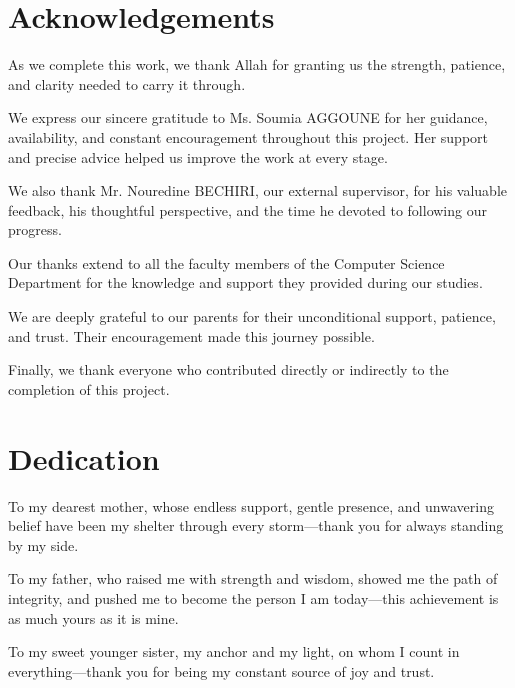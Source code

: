 \documentclass[12pt,a4paper]{report}
\begin{document}
\hypersetup{pageanchor=false}

\clearpage
\hypersetup{pageanchor=true}


\chapter*{Acknowledgements}
As we complete this work, we thank Allah for granting us the strength, patience, and clarity needed to carry it through.

We express our sincere gratitude to Ms. Soumia AGGOUNE for her guidance, availability, and constant encouragement throughout this project. Her support and precise advice helped us improve the work at every stage.

We also thank Mr. Nouredine BECHIRI, our external supervisor, for his valuable feedback, his thoughtful perspective, and the time he devoted to following our progress.

Our thanks extend to all the faculty members of the Computer Science Department for the knowledge and support they provided during our studies.

We are deeply grateful to our parents for their unconditional support, patience, and trust. Their encouragement made this journey possible.

Finally, we thank everyone who contributed directly or indirectly to the completion of this project.

\clearpage

\chapter*{Dedication}

To my dearest mother, whose endless support, gentle presence, and unwavering belief have been my shelter through every storm—thank you for always standing by my side.

To my father, who raised me with strength and wisdom, showed me the path of integrity, and pushed me to become the person I am today—this achievement is as much yours as it is mine.

To my sweet younger sister, my anchor and my light, on whom I count in everything—thank you for being my constant source of joy and trust.
\end{document}
